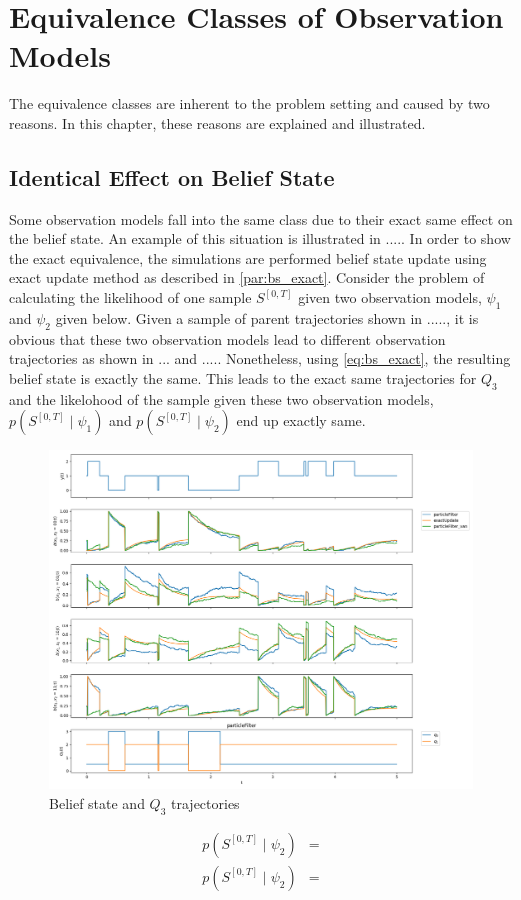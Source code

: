 \chapter{Equivalence Classes of Observation Models}
\label{ap:eq_classes}
The equivalence classes are inherent to the problem setting and caused by two reasons. In this chapter, these reasons are explained and illustrated.
\section*{Identical Effect on Belief State}
Some observation models fall into the same class due to their exact same effect on the belief state. An example of this situation is illustrated in ..... In order to show the exact equivalence, the simulations are performed belief state update using exact update method as described in \cref{par:bs_exact}. Consider the problem of calculating the likelihood of one sample $ S^{[0,T]} $ given two observation models, $ \psi_1 $ and $ \psi_2 $ given below. Given a sample of parent trajectories shown in ....., it is obvious that these two observation models lead to different observation trajectories as shown in ... and ..... Nonetheless, using \autoref{eq:bs_exact}, the resulting belief state is exactly the same. This leads to the exact same trajectories for $ Q_3 $ and the likelohood of the sample given these two observation models, $ p(S^{[0,T]} \mid \psi_1 ) $ and $ p(S^{[0,T]} \mid \psi_2 ) $ end up exactly same. %
\begin{figure}[H]
	\begin{center}
		\includegraphics[width=.60\textwidth]{figures/b_q_traj}
		\caption{Belief state and $ Q_3 $ trajectories}
		\label{fig:b_q_traj}
	\end{center}
\end{figure}
\begin{align}
p(S^{[0,T]} \mid \psi_2 ) &= \\
p(S^{[0,T]} \mid \psi_2 ) &=
\label{eq:integral}
\end{align}
